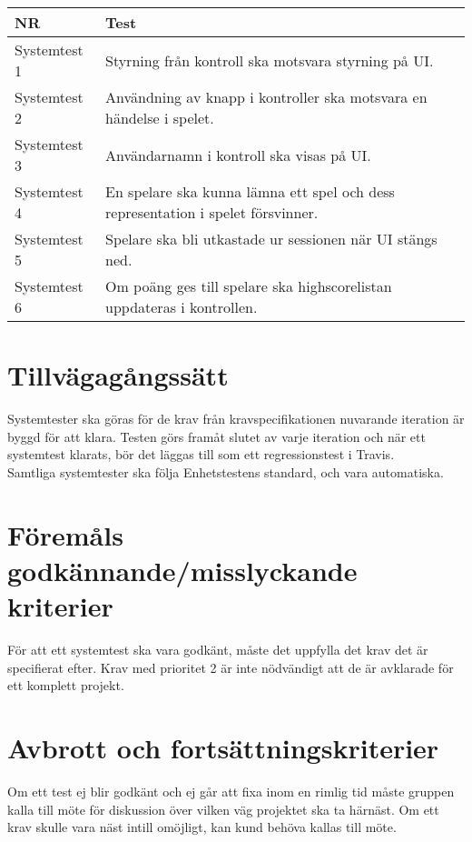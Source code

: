   \noindent
	\begin{tabular}{| p{2.1cm}| p{8cm}|}

      \hline
      NR&Test\\
      \hline

		Systemtest 1&Styrning från kontroll ska motsvara styrning på UI.\\
		\hline
		Systemtest 2&Användning av knapp i kontroller ska motsvara en händelse i spelet.\\
		\hline
		Systemtest 3&Användarnamn i kontroll ska visas på UI.\\
		\hline
		Systemtest 4&En spelare ska kunna lämna ett spel och dess representation i spelet försvinner.\\
		\hline
		Systemtest 5&Spelare ska bli utkastade ur sessionen när UI stängs ned.\\
		\hline
		Systemtest 6&Om poäng ges till spelare ska highscorelistan uppdateras i kontrollen.\\
		\hline




  \end{tabular}




\section{Tillvägagångssätt}
	Systemtester ska göras för de krav från kravspecifikationen nuvarande iteration är byggd för att klara. Testen görs framåt slutet av varje iteration och när ett systemtest klarats, bör det läggas till som ett regressionstest i Travis.\\

	Samtliga systemtester ska följa Enhetstestens standard, och vara automatiska.




\section{Föremåls godkännande/misslyckande kriterier}
	För att ett systemtest ska vara godkänt, måste det uppfylla det krav det är specifierat efter. Krav med prioritet 2 är inte nödvändigt att de är avklarade för ett komplett projekt.\\


\section{Avbrott och fortsättningskriterier}
	Om ett test ej blir godkänt och ej går att fixa inom en rimlig tid måste gruppen kalla till möte för diskussion över vilken väg projektet ska ta härnäst. Om ett krav skulle vara näst intill omöjligt, kan kund behöva kallas till möte.




